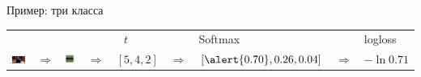 \documentclass[notes,12pt, aspectratio=169]{beamer}
\begin{document}
\begin{frame}{Пример: три класса}
\begin{tabular}{m{2.5cm} m{0.35cm} m{1.8cm} m{0.35cm} m{1cm} m{0.35cm} m{2.7cm} m{0.5cm} m{1.5cm}} 

& & & &  {\large  $\mbox{ }t$ } &  &  {\large \hspace{5pt} Softmax} &  &  {\large  logloss} \\
\includegraphics[scale=0.2]{tab_cat.png} & {\Large $\Rightarrow$} & \includegraphics[scale=0.2]{tab_nn.png}  &  {\Large $\Rightarrow$} &  $[5, 4, 2]$ &  {\Large $\Rightarrow$} &  $[\alert{0.70}, 0.26, 0.04]$ & {\Large $\Rightarrow$}  & $-\ln 0.71$\\


\end{tabular}
\end{frame}
\end{document}
